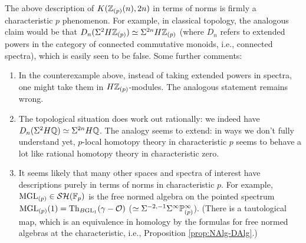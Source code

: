 \documentclass{amsart}
\numberwithin{proposition}{section}
\numberwithin{equation}{section}
\begin{document}
\begin{remark}
The above description of $K(\mathbb{Z}_{(p)}(n), 2n)$ in terms of norms is firmly a characteristic $p$ phenomenon.
For example, in classical topology, the analogous claim would be that $D_n(\Sigma^{2} H\mathbb{Z}_{(p)}) \simeq \Sigma^{2n} H\mathbb{Z}_{(p)}$ (where $D_n$ refers to extended powers in the category of connected commutative monoids, i.e., connected spectra), which is easily seen to be false.
Some further comments:
\begin{enumerate}
\item In the counterexample above, instead of taking extended powers in spectra, one might take them in $H\mathbb{Z}_{(p)}$-modules.
  The analogous statement remains wrong.
\item The topological situation does work out rationally: we indeed have $D_n(\Sigma^2 H\mathbb{Q}) \simeq \Sigma^{2n} H\mathbb{Q}$.
  The analogy seems to extend: in ways we don't fully understand yet, $p$-local homotopy theory in characteristic $p$ seems to behave a lot like rational homotopy theory in characteristic zero.
\item It seems likely that many other spaces and spectra of interest have descriptions purely in terms of norms in characteristic $p$.
  For example, $\mathrm{MGL}_{(p)} \in \mathcal{SH}(\mathbb{F}_p)$ is the free normed algebra on the pointed spectrum $\mathrm{MGL}_{(p)}(1) = \mathrm{Th}_{B\mathrm{GL}_1}(\gamma - \mathcal O)$ ($\simeq \Sigma^{-2,-1} \Sigma^\infty \mathbb P^\infty_{(p)}$).
  (There is a tautological map, which is an equivalence in homology by the formulas for free normed algebras at the characteristic, i.e., Proposition \ref{prop:NAlg-DAlg}.)
\end{enumerate}
\end{remark}
\end{document}
